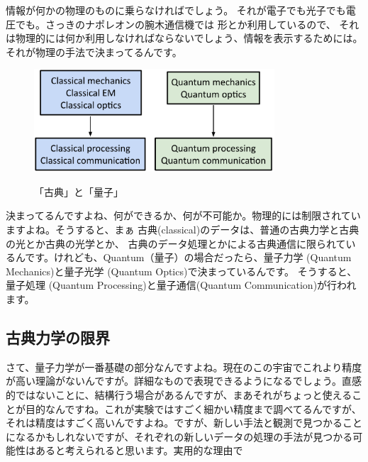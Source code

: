 情報が何かの物理のものに乗らなければでしょう。
それが電子でも光子でも電圧でも。さっきのナポレオンの腕木通信機では
形とか利用しているので、
それは物理的には何か利用しなければならないでしょう、情報を表示するためには。それが物理の手法で決まってるんです。
\begin{figure}[H]
    \centering
    \includegraphics[width=0.8\textwidth]{lesson1/comparsion.pdf}
    \label{fig: 1}
    \begin{center}
        \caption{「古典」と「量子」}
    \end{center}
\end{figure}
決まってるんですよね、何ができるか、何が不可能か。物理的には制限されていますよね。そうすると、まぁ
古典(classical)のデータは、普通の古典力学と古典の光とか古典の光学とか、
古典のデータ処理とかによる古典通信に限られているんです。けれども、Quantum（量子）の場合だったら、量子力学 (Quantum Mechanics)と量子光学 (Quantum Optics)で決まっているんです。
そうすると、量子処理 (Quantum Processing)と量子通信(Quantum Communication)が行われます。

\subsection{古典力学の限界}
さて、量子力学が一番基礎の部分なんですよね。現在のこの宇宙でこれより精度が高い理論がないんですが。詳細なもので表現できるようになるでしょう。直感的ではないことに、結構行う場合があるんですが、まあそれがちょっと使えることが目的なんですね。これが実験ではすごく細かい精度まで調べてるんですが、それは精度はすごく高いんですよね。ですが、新しい手法と観測で見つかることになるかもしれないですが、それぞれの新しいデータの処理の手法が見つかる可能性はあると考えられると思います。実用的な理由で


